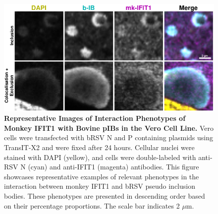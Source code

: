 \begin{figure}
    \centering
    \includegraphics[width=1\linewidth]{09. Chapter 4/Figs/01. pIB/02. IFIT1/09. i1-vero-bnbp.pdf}
    \caption[Representative Images of Interaction Phenotypes of Monkey IFIT1 with Bovine pIBs in the Vero Cell Line.]{\textbf{Representative Images of Interaction Phenotypes of Monkey IFIT1 with Bovine pIBs in the Vero Cell Line.} Vero cells were transfected with bRSV N and P containing plasmids using TransIT-X2 and were fixed after 24 hours. Cellular nuclei were stained with DAPI (yellow), and cells were double-labeled with anti-RSV N (cyan) and anti-IFIT1 (magenta) antibodies. This figure showcases representative examples of relevant phenotypes in the interaction between monkey IFIT1 and bRSV pseudo inclusion bodies. These phenotypes are presented in descending order based on their percentage proportions. The scale bar indicates 2 \(\mu \mbox{m}\).}
    \label{fig:Representative Images of Interaction Phenotypes of Monkey IFIT1 with Bovine pIBs in the VERO Cell Line}
\end{figure}

